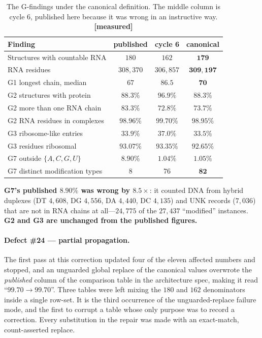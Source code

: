 \documentclass[11pt,a4paper]{article}
\newcommand{\meas}{\textcolor{measured}{\textbf{[measured]}}}
\begin{document}
\begin{table}[h]
\centering
\caption{The G-findings under the canonical definition. The middle column is
cycle 6, published here because it was wrong in an instructive way. \meas}
\small
\begin{tabular}{lccc}
\toprule
\textbf{Finding} & \textbf{published} & \textbf{cycle 6} & \textbf{canonical} \\
\midrule
Structures with countable RNA      & $180$     & $162$     & $\mathbf{179}$ \\
RNA residues                       & $308{,}370$ & $306{,}857$ & $\mathbf{309{,}197}$ \\
G1 longest chain, median           & $67$      & $86.5$    & $\mathbf{70}$ \\
G2 structures with protein         & $88.3\%$  & $96.9\%$  & $\mathbf{88.3\%}$ \\
G2 more than one RNA chain         & $83.3\%$  & $72.8\%$  & $\mathbf{73.7\%}$ \\
G2 RNA residues in complexes       & $98.96\%$ & $99.70\%$ & $\mathbf{98.95\%}$ \\
G3 ribosome-like entries           & $33.9\%$  & $37.0\%$  & $\mathbf{33.5\%}$ \\
G3 residues ribosomal              & $93.07\%$ & $93.35\%$ & $\mathbf{92.65\%}$ \\
G7 outside $\{A,C,G,U\}$           & $8.90\%$  & $1.04\%$  & $\mathbf{1.05\%}$ \\
G7 distinct modification types     & $8$       & $76$      & $\mathbf{82}$ \\
\bottomrule
\end{tabular}
\end{table}

\textbf{G7's published $8.90\%$ was wrong by $8.5\times$}: it counted DNA from
hybrid duplexes (DT $4{,}608$, DG $4{,}556$, DA $4{,}440$, DC $4{,}135$) and UNK
records ($7{,}036$) that are not in RNA chains at all---$24{,}775$ of the
$27{,}437$ ``modified'' instances. \textbf{G2 and G3 are unchanged from the
published figures.}

\paragraph{Defect \#24 --- partial propagation.} The first pass at this
correction updated four of the eleven affected numbers and stopped, and an
unguarded global replace of the canonical values overwrote the \emph{published}
column of the comparison table in the architecture spec, making it read
``$99.70 \rightarrow 99.70$''. Three tables were left mixing the $180$ and $162$
denominators inside a single row-set. It is the third occurrence of the
unguarded-replace failure mode, and the first to corrupt a table whose only
purpose was to record a correction. Every substitution in the repair was made
with an exact-match, count-asserted replace.
\end{document}
